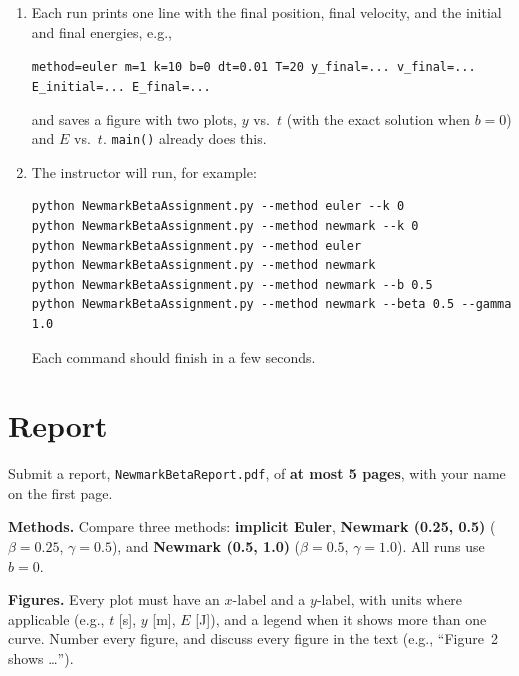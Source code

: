 \documentclass[letterpaper,11pt]{article}
\begin{document}
\begin{enumerate}
    \item Each run prints one line with the final position, final velocity, and the initial and final energies, e.g.,
    \begin{center}
    \scriptsize\texttt{method=euler m=1 k=10 b=0 dt=0.01 T=20 y\_final=... v\_final=... E\_initial=... E\_final=...}
    \end{center}
    and saves a figure with two plots, $y$ vs.\ $t$ (with the exact solution when $b = 0$) and $E$ vs.\ $t$. \texttt{main()} already does this.
    \item The instructor will run, for example:
\begin{verbatim}
python NewmarkBetaAssignment.py --method euler --k 0
python NewmarkBetaAssignment.py --method newmark --k 0
python NewmarkBetaAssignment.py --method euler
python NewmarkBetaAssignment.py --method newmark
python NewmarkBetaAssignment.py --method newmark --b 0.5
python NewmarkBetaAssignment.py --method newmark --beta 0.5 --gamma 1.0
\end{verbatim}
    Each command should finish in a few seconds.
\end{enumerate}

\section*{Report}

Submit a report, \texttt{NewmarkBetaReport.pdf}, of \textbf{at most 5 pages}, with your name on the first page.

\textbf{Methods.} Compare three methods: \textbf{implicit Euler}, \textbf{Newmark (0.25, 0.5)} ($\beta = 0.25$, $\gamma = 0.5$), and \textbf{Newmark (0.5, 1.0)} ($\beta = 0.5$, $\gamma = 1.0$). All runs use $b = 0$.

\textbf{Figures.} Every plot must have an $x$-label and a $y$-label, with units where applicable (e.g., $t$ [s], $y$ [m], $E$ [J]), and a legend when it shows more than one curve. Number every figure, and discuss every figure in the text (e.g., ``Figure~2 shows \ldots'').
\end{document}
